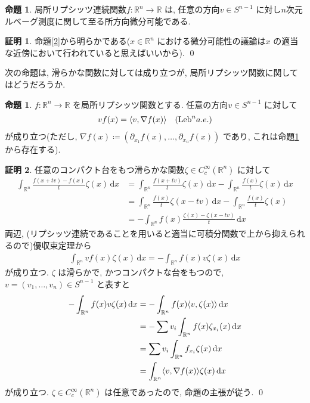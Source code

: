 \documentclass[twocolumn, landscape, a4paper , 8pt, fleqn, titlepage ]{jsarticle}
\theoremstyle{definition}
\newtheorem{prop}[dfn]{命題}
\newtheorem*{pf*}{証明}
\newcommand{\tbra}[1]{\mleft\langle#1\mright\rangle}
\newcommand{\Leb}{\textrm{Leb}}
\renewcommand{\d}{\, \textrm{d} }
\renewcommand{\-}{\hyphen}
\begin{document}
\begin{prop}\label{3}
局所リプシッツ連続関数$f:\mathbb R^n \rightarrow \mathbb R$ は, 任意の方向$v \in S^{n-1} $ に対し$n$次元ルベーグ測度に関して至る所方向微分可能である. 
\end{prop}
\begin{pf*}
命題\ref{2}から明らかである($x \in \mathbb R^n$ における微分可能性の議論は$x$ の適当な近傍において行われていると思えばいいから). 
\qed
\end{pf*}


次の命題は, 滑らかな関数に対しては成り立つが, 局所リプシッツ関数に関してはどうだろうか. 

\begin{prop}\label{4}
$f:\mathbb R^n \rightarrow \mathbb R$ を局所リプシッツ関数とする. 任意の方向$v \in S^{n-1} $ に対して
\begin{align*} vf(x) = \tbra{v, \nabla f (x)} \quad (\Leb^n a.e.)\end{align*}
が成り立つ(ただし, $\nabla f(x) \coloneqq (\partial_{x_1} f (x), \ldots, \partial_{x_n} f(x))$ であり, これは命題\ref{3}から存在する). 
\end{prop}
\begin{pf*}
任意のコンパクト台をもつ滑らかな関数$\zeta \in C_c^\infty (\mathbb R^n )$ に対して
\begin{align*}  \int_{\mathbb R^n} \frac{f(x+tv) -f (x)}{t} \zeta (x) \d x &= \int_{\mathbb R^n} \frac{f(x+tv)}{t}\zeta (x) \d x  - \int_{\mathbb R^n} \frac{f(x)}{t}\zeta (x) \d x \\
&= \int_{\mathbb R^n} \frac{f(x)}{t}\zeta (x-tv) \d x  - \int_{\mathbb R^n} \frac{f(x)}{t}\zeta (x) \\
&= - \int_{\mathbb R^n} f(x) \frac{\zeta (x) - \zeta (x-tv)}{t} \d x
\end{align*}
両辺, (リプシッツ連続であることを用いると適当に可積分関数で上から抑えられるので)優収束定理から
\begin{align*} \int_{\mathbb R^n} vf(x) \zeta (x) \d x = - \int_{\mathbb R^n} f(x) v\zeta(x) \d x\end{align*}
が成り立つ.  $\zeta $ は滑らかで, かつコンパクトな台をもつので, $v = (v_1, \ldots, v_n) \in S^{n-1}$ と表すと
\begin{align*} - \int_{\mathbb R^n} f(x) v\zeta(x) \d x &= - \int_{\mathbb R^n} f(x) \tbra{v, \zeta (x)} \d x \\
&= - \sum v_i \int_{\mathbb R^n} f(x) \zeta_{x_i} (x) \d x \\
&= \sum v_i \int_{\mathbb R^n} f_{x_i} \zeta (x) \d x \\
&= \int_{\mathbb R^n} \tbra{v, \nabla f(x)} \zeta (x) \d x
\end{align*}
が成り立つ. $\zeta \in C_c^\infty (\mathbb R^n)$ は任意であったので, 命題の主張が従う. 
\qed
\end{pf*}
\end{document}
